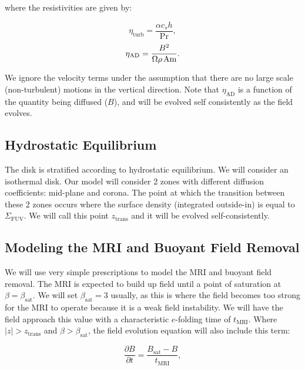 \noindent where the resistivities are given by:

\begin{equation}
\eta_{\text{turb}} = \frac{\alpha c_s h}{\text{Pr}},
\end{equation}
\begin{equation}
\eta_{\text{AD}}   = \frac{B^2}{\Omega \rho \hspace{0.5mm} \text{Am}}.                   
\end{equation}

\noindent We ignore the velocity terms under the assumption that there are no large scale (non-turbulent) motions in the vertical direction.  Note that $\eta_{\text{AD}}$ is a function of the quantity being diffused ($B$), and will be evolved self consistently as the field evolves.  


\subsection{Hydrostatic Equilibrium}
The disk is stratified according to hydrostatic equilibrium.  We will consider an isothermal disk.  Our model will consider 2 zones with different diffusion coefficients: mid-plane and corona.  The point at which the transition between these 2 zones occurs where the surface density (integrated outside-in) is equal to $\Sigma_\text{FUV}$.  We will call this point $z_\text{trans}$ and it will be evolved self-consistently.  


\subsection{Modeling the MRI and Buoyant Field Removal}
We will use very simple prescriptions to model the MRI and buoyant field removal.  The MRI is expected to build up field until a point of saturation at $\beta=\beta_\text{sat}$.  We will set $\beta_\text{sat}=3$ usually, as this is where the field becomes too strong for the MRI to operate because it is a weak field instability.  We will have the field approach this value with a characteristic $e$-folding time of $t_{\text{MRI}}$.  Where $|z|>z_{\text{trans}}$ and $\beta>\beta_{\text{sat}}$, the field evolution equation will also include this term:

\begin{equation}
\frac{\partial B}{\partial t} = \frac{B_{\text{sat}}-B}{t_\text{MRI}}, 
\end{equation}

